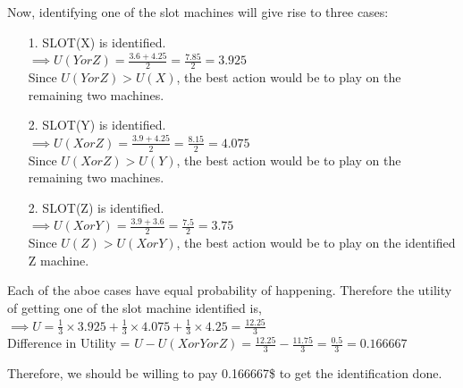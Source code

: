 \documentclass[letter, 10pt]{article}
\begin{document}
Now, identifying one of the slot machines will give rise to three cases:
\begin{itemize}
    \item[1.] SLOT(X) is identified.\\
    $\implies U(Y or Z) = \frac{3.6 + 4.25}{2} = \frac{7.85}{2} = 3.925$\\
    Since $U(Y or Z)>U(X)$, the best action would be to play on the remaining two machines.
    \item[2.] SLOT(Y) is identified.\\
    $\implies U(X or Z) = \frac{3.9 + 4.25}{2} = \frac{8.15}{2} = 4.075$\\
    Since $U(X or Z)>U(Y)$, the best action would be to play on the remaining two machines.
    \item[2.] SLOT(Z) is identified.\\
    $\implies U(X or Y) = \frac{3.9 + 3.6}{2} = \frac{7.5}{2} = 3.75$\\
    Since $U(Z)>U(XorY)$, the best action would be to play on the identified Z machine.
\end{itemize}

Each of the aboe cases have equal probability of happening. Therefore the utility of getting one of the slot machine identified is,\\
$\implies U = \frac{1}{3}\times3.925+\frac{1}{3}\times4.075+\frac{1}{3}\times4.25 = \frac{12.25}{3}$\\

Difference in Utility = $U-U(X or Y or Z) = \frac{12.25}{3}-\frac{11.75}{3} = \frac{0.5}{3} = 0.166667$

Therefore, we should be willing to pay 0.166667\$ to get the identification done.
\end{document}
